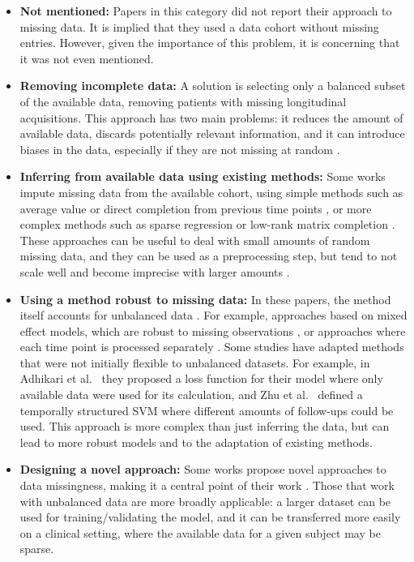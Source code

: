\begin{itemize}\itemsep7pt

\item \textbf{Not mentioned:} Papers in this category did not report their approach to missing data. It is implied that they used a data cohort without missing entries. However, given the importance of this problem, it is concerning that it was not even mentioned.

\item \textbf{Removing incomplete data:} A solution is selecting only a balanced subset of the available data, removing patients with missing longitudinal acquisitions. This approach has two main problems: it reduces the amount of available data, discards potentially relevant information, and it can introduce biases in the data, especially if they are not missing at random \cite{Lo2012}.

\item \textbf{Inferring from available data using existing methods:} Some works impute missing data from the available cohort, using simple methods such as average value \cite{Zhou2013a} or direct completion from previous time points \cite{Adhikari2019,Huang2016b}, or more complex methods such as sparse regression \cite{Huang2016c} or low-rank matrix completion \cite{Thung2016}. These approaches can be useful to deal with small amounts of random missing data, and they can be used as a preprocessing step, but tend to not scale well and become imprecise with larger amounts \cite{Ibrahim}. 

\item \textbf{Using a method robust to missing data:} In these papers, the method itself accounts for unbalanced data \cite{Liu2015b}. For example, approaches based on mixed effect models, which are robust to missing observations \cite{Donohue14,Schmidt-Richberg2015}, or approaches where each time point is processed separately \cite{guerrero}. Some studies have adapted methods that were not initially flexible to unbalanced datasets. For example, in Adhikari et al.\ \cite{Adhikari2019} they proposed a loss function for their model where only available data were used for its calculation, and Zhu et al.\ \cite{Zhu2016a} defined a temporally structured SVM where different amounts of follow-ups could be used. This approach is more complex than just inferring the data, but can lead to more robust models and to the adaptation of existing methods. 
\item \textbf{Designing a novel approach:} Some works propose novel approaches to data missingness, making it a central point of their work \cite{Dawson2016,Ghazi2019,Goyal2018,Jie2017,Zhu2018}. Those that work with unbalanced data are more broadly applicable: a larger dataset can be used for training/validating the model, and it can be transferred more easily on a clinical setting, where the available data for a given subject may be sparse.

\end{itemize}

